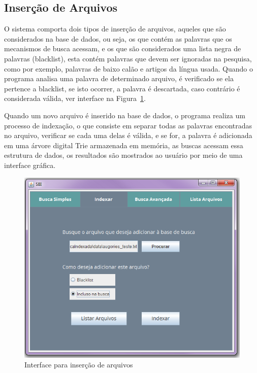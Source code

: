 \documentclass[12pt]{article}
\begin{document}
\subsection{Inserção de Arquivos}

O sistema comporta dois tipos de inserção de arquivos, aqueles que são considerados na base de dados, ou seja, os que contém as palavras que os mecanismos de busca acessam, e os que são considerados uma lista negra de palavras (blacklist), esta contém palavras que devem ser ignoradas na pesquisa, como por exemplo, palavras de baixo calão e artigos da língua usada. Quando o programa analisa uma palavra de determinado arquivo, é verificado se ela pertence a blacklist, se isto ocorrer, a palavra é descartada, caso contrário é considerada válida, ver interface na Figura~\ref{fig:insercaoArquivos}. 

Quando um novo arquivo é inserido na base de dados, o programa realiza um processo de indexação, o que consiste em separar todas as palavras encontradas no arquivo, verificar se cada uma delas é válida, e se for, a palavra é adicionada em uma árvore digital Trie armazenada em memória, as buscas acessam essa estrutura de dados, os resultados são mostrados ao usuário por meio de uma interface gráfica.

\begin{figure}[!htb]
\centering
\includegraphics[width=.9\textwidth]{img/tela2-preenchida.png}
\caption{Interface para inserção de arquivos}
\label{fig:insercaoArquivos}
\end{figure}
\end{document}
